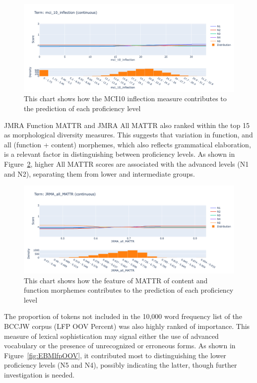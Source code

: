 \begin{figure}[h!]
    \centering
    \includegraphics[scale=.4]{img/EBM/MCI10inflection}
    \caption[Contribution of MCI 10 Inflection measure]{This chart shows how the MCI10 inflection measure contributes to the prediction of each proficiency level}
    \label{fig:EBMMCI10inflection}
\end{figure}

JMRA Function MATTR and JMRA All MATTR also ranked within the top 15 as morphological diversity measures. This
suggests that variation in function, and all (function + content) morphemes, which also reflects grammatical
elaboration, is a
relevant factor in distinguishing between proficiency levels. As shown in Figure~\ref{fig:JMRAallMATTR}, higher
All MATTR
scores are associated with the advanced levels (N1 and N2), separating them from lower and intermediate groups.

\begin{figure}[h!]
    \centering
    \includegraphics[scale=.4]{img/EBM/JMRAallMATTR}
    \caption[Contribution of JMRA function and content morphemes]{This chart shows how the feature of MATTR of content and function morphemes contributes to the prediction of each proficiency level}
    \label{fig:JMRAallMATTR}
\end{figure}

The proportion of tokens not included in the 10,000 word frequency list of the BCCJW corpus (LFP OOV Percent) was
also highly ranked of importance. This measure of lexical sophistication may signal either the use of advanced
vocabulary or the presence of unrecognized or erroneous forms. As shown in Figure~\ref{fig:EBMlfpOOV}, it
contributed most to distinguishing the lower proficiency levels (N5 and N4), possibly indicating the latter, though
further investigation is needed.


